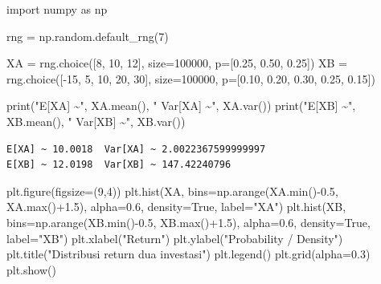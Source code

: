 \documentclass[
  letterpaper,
  DIV=11,
  numbers=noendperiod]{scrreprt}
\newenvironment{Shaded}{\begin{snugshade}}{\end{snugshade}}
\newcommand{\BuiltInTok}[1]{\textcolor[rgb]{0.00,0.23,0.31}{#1}}
\newcommand{\DecValTok}[1]{\textcolor[rgb]{0.68,0.00,0.00}{#1}}
\newcommand{\FloatTok}[1]{\textcolor[rgb]{0.68,0.00,0.00}{#1}}
\newcommand{\ImportTok}[1]{\textcolor[rgb]{0.00,0.46,0.62}{#1}}
\newcommand{\NormalTok}[1]{\textcolor[rgb]{0.00,0.23,0.31}{#1}}
\newcommand{\OperatorTok}[1]{\textcolor[rgb]{0.37,0.37,0.37}{#1}}
\newcommand{\StringTok}[1]{\textcolor[rgb]{0.13,0.47,0.30}{#1}}
\newcommand{\VariableTok}[1]{\textcolor[rgb]{0.07,0.07,0.07}{#1}}
\begin{document}
\begin{Shaded}
\begin{Highlighting}[]
\ImportTok{import}\NormalTok{ numpy }\ImportTok{as}\NormalTok{ np}

\NormalTok{rng }\OperatorTok{=}\NormalTok{ np.random.default\_rng(}\DecValTok{7}\NormalTok{)}

\NormalTok{XA }\OperatorTok{=}\NormalTok{ rng.choice([}\DecValTok{8}\NormalTok{, }\DecValTok{10}\NormalTok{, }\DecValTok{12}\NormalTok{], size}\OperatorTok{=}\DecValTok{100000}\NormalTok{, p}\OperatorTok{=}\NormalTok{[}\FloatTok{0.25}\NormalTok{, }\FloatTok{0.50}\NormalTok{, }\FloatTok{0.25}\NormalTok{])}
\NormalTok{XB }\OperatorTok{=}\NormalTok{ rng.choice([}\OperatorTok{{-}}\DecValTok{15}\NormalTok{, }\DecValTok{5}\NormalTok{, }\DecValTok{10}\NormalTok{, }\DecValTok{20}\NormalTok{, }\DecValTok{30}\NormalTok{], size}\OperatorTok{=}\DecValTok{100000}\NormalTok{, p}\OperatorTok{=}\NormalTok{[}\FloatTok{0.10}\NormalTok{, }\FloatTok{0.20}\NormalTok{, }\FloatTok{0.30}\NormalTok{, }\FloatTok{0.25}\NormalTok{, }\FloatTok{0.15}\NormalTok{])}

\BuiltInTok{print}\NormalTok{(}\StringTok{"E[XA] \textasciitilde{}"}\NormalTok{, XA.mean(), }\StringTok{" Var[XA] \textasciitilde{}"}\NormalTok{, XA.var())}
\BuiltInTok{print}\NormalTok{(}\StringTok{"E[XB] \textasciitilde{}"}\NormalTok{, XB.mean(), }\StringTok{" Var[XB] \textasciitilde{}"}\NormalTok{, XB.var())}
\end{Highlighting}
\end{Shaded}

\begin{verbatim}
E[XA] ~ 10.0018  Var[XA] ~ 2.0022367599999997
E[XB] ~ 12.0198  Var[XB] ~ 147.42240796
\end{verbatim}

\begin{Shaded}
\begin{Highlighting}[]
\NormalTok{plt.figure(figsize}\OperatorTok{=}\NormalTok{(}\DecValTok{9}\NormalTok{,}\DecValTok{4}\NormalTok{))}
\NormalTok{plt.hist(XA, bins}\OperatorTok{=}\NormalTok{np.arange(XA.}\BuiltInTok{min}\NormalTok{()}\OperatorTok{{-}}\FloatTok{0.5}\NormalTok{, XA.}\BuiltInTok{max}\NormalTok{()}\OperatorTok{+}\FloatTok{1.5}\NormalTok{), alpha}\OperatorTok{=}\FloatTok{0.6}\NormalTok{, density}\OperatorTok{=}\VariableTok{True}\NormalTok{, label}\OperatorTok{=}\StringTok{"XA"}\NormalTok{)}
\NormalTok{plt.hist(XB, bins}\OperatorTok{=}\NormalTok{np.arange(XB.}\BuiltInTok{min}\NormalTok{()}\OperatorTok{{-}}\FloatTok{0.5}\NormalTok{, XB.}\BuiltInTok{max}\NormalTok{()}\OperatorTok{+}\FloatTok{1.5}\NormalTok{), alpha}\OperatorTok{=}\FloatTok{0.6}\NormalTok{, density}\OperatorTok{=}\VariableTok{True}\NormalTok{, label}\OperatorTok{=}\StringTok{"XB"}\NormalTok{)}
\NormalTok{plt.xlabel(}\StringTok{"Return"}\NormalTok{)}
\NormalTok{plt.ylabel(}\StringTok{"Probability / Density"}\NormalTok{)}
\NormalTok{plt.title(}\StringTok{"Distribusi return dua investasi"}\NormalTok{)}
\NormalTok{plt.legend()}
\NormalTok{plt.grid(alpha}\OperatorTok{=}\FloatTok{0.3}\NormalTok{)}
\NormalTok{plt.show()}
\end{Highlighting}
\end{Shaded}
\end{document}
